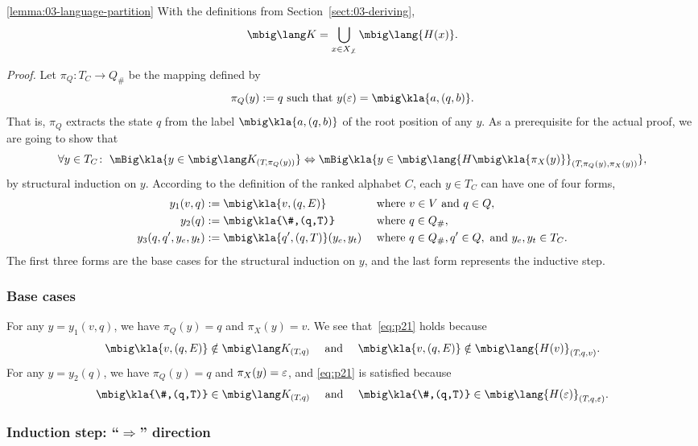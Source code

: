 \begin{repeatlemma}{\ref{lemma:03-language-partition}}
 With the definitions from Section~\ref{sect:03-deriving},
 \[
  \mbig\lang K = \bigcup_{x\in X_{\not\bot}} \mbig\lang{H(x)}.
 \]
\end{repeatlemma}

\emph{Proof.} Let $\pi_Q\colon T_C\to Q_\#$ be the mapping defined by
\[
 \pi_Q(y) := q \text{ such that } y(\eps) = \mbig\kla{a,(q,b)}.
\]
That is, $\pi_Q$ extracts the state $q$ from the label $\mbig\kla{a,(q,b)}$
of the root position of any $y$. As a prerequisite for the actual proof, we are
going to show that
\begin{equation}\label{eq:p21}
 \forall y\in T_C\colon\;
 \mBig\kla{y\in\mbig\lang K_{(T\!,\pi_Q(y))}}
 \Leftrightarrow
 \mBig\kla{y\in\mbig\lang{H\mbig\kla{\pi_X(y)}}_{(T\!,\pi_Q(y),\pi_X(y))}},
\end{equation}
by structural induction on $y$. According to the definition of the ranked
alphabet $C$, each $y\in T_C$ can have one of four forms,
\begin{align*}
 y_1(v,q) &:= \mbig\kla{v,(q,E)} &&\text{ where } v\in V\text{ and } q\in Q, \\
 y_2(q) &:= \mbig\kla{\#,(q,T)} &&\text{ where } q\in Q_\#, \\
 y_3(q,q',y_e,y_t) &:= \mbig\kla{q',(q,T)}(y_e,y_t) &&\text{ where } q\in Q_\#, q'\in Q, \text{ and } y_e,y_t\in T_C.
\end{align*}
The first three forms are the base cases for the structural induction on $y$,
and the last form represents the inductive step.

\subsubsection*{Base cases}

For any $y=y_1(v,q)$, we have
$\pi_Q(y)=q$ and $\pi_X(y)=v$. We see that~\eqref{eq:p21} holds because
\[
 \mbig\kla{v,(q,E)} \notin \mbig\lang K_{(T\!,q)}
 \quad\text{ and }\quad
 \mbig\kla{v,(q,E)} \notin \mbig\lang{H(v)}_{(T\!,q,v)}.
\]
For any $y=y_2(q)$, we have $\pi_Q(y) = q$ and $\pi_X(y)=\varepsilon$, and \eqref{eq:p21} is
satisfied because
\[
 \mbig\kla{\#,(q,T)} \in \mbig\lang K_{(T\!,q)}
 \quad\text{ and }\quad
 \mbig\kla{\#,(q,T)} \in \mbig\lang{H(\eps)}_{(T\!,q,\eps)}.
\]

\subsubsection*{Induction step: ``$\Rightarrow$'' direction}

